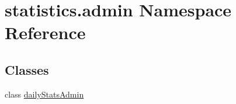 \hypertarget{namespacestatistics_1_1admin}{}\section{statistics.\+admin Namespace Reference}
\label{namespacestatistics_1_1admin}
\subsection*{Classes}
\begin{DoxyCompactItemize}
\item 
class \hyperlink{classstatistics_1_1admin_1_1dailyStatsAdmin}{daily\+Stats\+Admin}
\end{DoxyCompactItemize}
